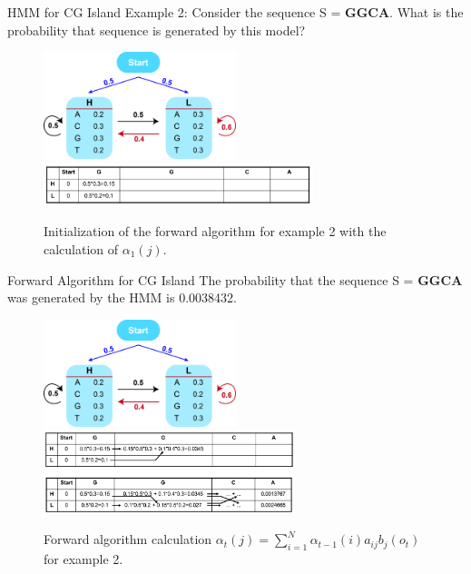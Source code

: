 \documentclass{beamer}
\begin{document}
\begin{frame}{HMM for CG Island}
	Example 2: Consider the sequence  S = \textbf{GGCA}. What is the probability that sequence is generated by this model?
	\begin{figure}
		\centering
		\includegraphics[width = 0.5\textwidth]{example1.jpg}
		\includegraphics[width = 0.7\textwidth]{example2cal1.png}
		\caption{Initialization of the forward algorithm for example 2 with the calculation of $\alpha_1(j)$.}
	\end{figure}
	
\end{frame}

\begin{frame}{Forward Algorithm for CG Island}
	The probability that the sequence S = \textbf{GGCA} was generated by the HMM is 0.0038432.
	\begin{figure}
		\centering
		\includegraphics[width = 0.5\textwidth]{example1.jpg}
		\includegraphics[width = 0.65\textwidth]{example2cal2.png}
		\includegraphics[width = 0.65\textwidth]{example2cal3.png}
		\caption{Forward algorithm calculation $\alpha_t(j) = \sum_{i=1}^N \alpha_{t-1}(i)a_{ij} b_j(o_t)$ for example 2.}
	\end{figure}
\end{frame}
\end{document}
